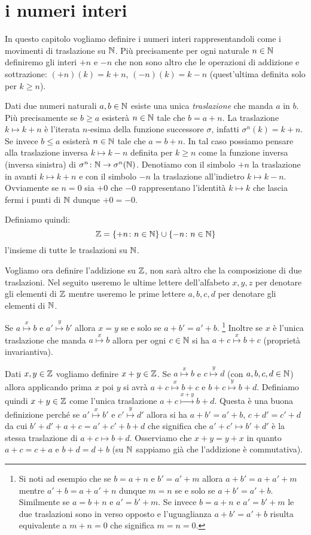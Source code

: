 \section{i numeri interi}

In questo capitolo vogliamo definire i numeri interi rappresentandoli 
come i movimenti di traslazione su ${\mathbb N}$. 
Più precisamente per ogni naturale $n\in{\mathbb N}$ definiremo gli interi 
$+n$ e $-n$ che non sono altro che le operazioni di addizione e sottrazione: 
$(+n)(k) = k+n$, $(-n)(k) = k-n$ (quest'ultima definita solo per $k\ge n$).

Dati due numeri naturali $a,b \in {\mathbb N}$ esiste una unica \emph{traslazione}
che manda $a$ in $b$.
Più precisamente se $b\ge a$ esisterà $n\in {\mathbb N}$ tale che $b=a+n$.
La traslazione $k\mapsto k+n$ è l'iterata $n$-esima della funzione 
successore $\sigma$, infatti $\sigma^n(k) = k+n$.
Se invece $b\le a$ esisterà $n\in {\mathbb N}$ tale che $a=b+n$. 
In tal caso possiamo pensare alla traslazione inversa $k\mapsto k-n$ 
definita per $k\ge n$ come la funzione inversa (inversa sinistra) di 
$\sigma^n\colon {\mathbb N}\to \sigma^n({\mathbb N})$.
Denotiamo con il simbolo $+n$ la traslazione in avanti $k\mapsto k+n$ e 
con il simbolo $-n$ la traslazione all'indietro $k\mapsto k-n$.
Ovviamente se $n=0$ sia $+0$ che $-0$ rappresentano l'identità $k\mapsto k$
che lascia fermi i punti di ${\mathbb N}$ dunque $+0=-0$.

Definiamo quindi:
\[
  {\mathbb Z} = {\left\{ +n\colon n\in {\mathbb N} \right\}} \cup {\left\{ -n\colon n\in {\mathbb N}\right\}}
\]
l'insieme di tutte le traslazioni su ${\mathbb N}$.

Vogliamo ora definire l'addizione su ${\mathbb Z}$, non sarà altro che la composizione 
di due traslazioni.
Nel seguito useremo le ultime lettere dell'alfabeto 
$x,y,z$ per denotare gli elementi di ${\mathbb Z}$ mentre 
useremo le prime lettere $a,b,c,d$ per denotare 
gli elementi di ${\mathbb N}$.

Se $a\stackrel x \mapsto b$ e $a'\stackrel y \mapsto b'$
allora $x=y$ se e solo se $a+b'=a'+b$.
\footnote{
  Si noti ad esempio che se $b=a+n$ e $b'=a'+m$ allora 
  $a+b' = a + a' + m$ mentre $a'+b = a+a'+n$ dunque 
  $m=n$ se e solo se $a+b'=a'+b$. 
  Similmente se $a=b+n$ e $a'=b'+m$.
  Se invece $b=a+n$ e $a'=b'+m$ le due traslazioni 
  sono in verso opposto e l'uguaglianza $a+b'=a'+b$ 
  risulta equivalente a $m+n=0$ che significa $m=n=0$.
}
Inoltre se $x$ è l'unica traslazione che manda $a\stackrel x \mapsto b$ 
allora per ogni $c\in {\mathbb N}$ si ha $a+c\stackrel x \mapsto b+c$
(proprietà invariantiva).

Dati $x,y\in {\mathbb Z}$ vogliamo definire $x+y\in {\mathbb Z}$.
Se $a\stackrel x\mapsto b$
e $c\stackrel y\mapsto d$ 
(con $a,b,c,d\in {\mathbb N}$)
allora applicando prima $x$ poi $y$ 
si avrà $a+c\stackrel x\mapsto b+c$ 
e $b+c\stackrel y\mapsto b+d$. 
Definiamo quindi $x+y\in {\mathbb Z}$ come l'unica traslazione 
$a+c \stackrel{x+y} \mapsto b+d$.
Questa è una buona definizione perché se $a'\stackrel x \mapsto b'$ 
e $c'\stackrel y \mapsto d'$ allora 
si ha $a+b'=a'+b$, $c+d'=c'+d$ 
da cui 
$b'+d' + a+c = a'+c' + b+d$ 
che significa che $a'+c'\mapsto b'+d'$ 
è la stessa traslazione di $a+c\mapsto b+d$.
Osserviamo che $x+y=y+x$ in quanto $a+c=c+a$ e $b+d=d+b$
(su ${\mathbb N}$ sappiamo già che l'addizione è commutativa).

